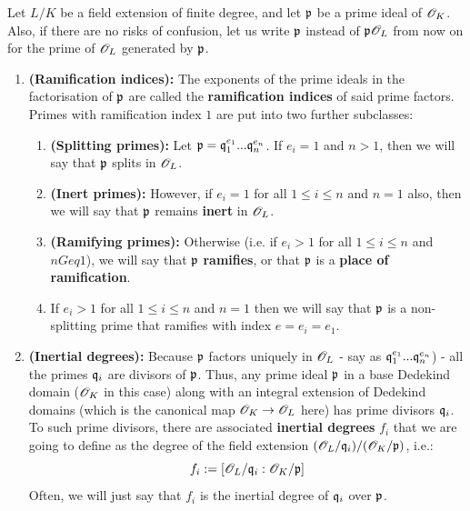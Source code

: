             \begin{definition} \label{def: ramification_indices}
                Let $L/K$ be a field extension of finite degree, and let $\mathfrak{p}$ be a prime ideal of $\mathscr{O}_K$. Also, if there are no risks of confusion, let us write $\mathfrak{p}$ instead of $\mathfrak{p}\mathscr{O}_L$ from now on for the prime of $\mathscr{O}_L$ generated by $\mathfrak{p}$.
                    \begin{enumerate}
                        \item \textbf{(Ramification indices):} The exponents of the prime ideals in the factorisation of $\mathfrak{p}$ are called the \textbf{ramification indices} of said prime factors. Primes with ramification index $1$ are put into two further subclasses:
                            \begin{enumerate}
                                \item \textbf{(Splitting primes):} Let $\mathfrak{p} = \mathfrak{q}_1^{e_1}...\mathfrak{q}_n^{e_n}$. If $e_i = 1$ and $n > 1$, then we will say that $\mathfrak{p}$ splits in $\mathscr{O}_L$.
                                \item \textbf{(Inert primes):} However, if $e_i = 1$ for all $1 \leq i \leq n$ and $n = 1$ also, then we will say that $\mathfrak{p}$ remains \textbf{inert} in $\mathscr{O}_L$.
                                \item \textbf{(Ramifying primes):} Otherwise (i.e. if $e_i > 1$ for all $1 \leq i \leq n$ and $n Geq 1$), we will say that $\mathfrak{p}$ \textbf{ramifies}, or that $\mathfrak{p}$ is a \textbf{place of ramification}.
                                \item If $e_i > 1$ for all $1 \leq i \leq n$ and $n = 1$ then we will say that $\mathfrak{p}$ is a non-splitting prime that ramifies with index $e = e_i = e_1$.
                            \end{enumerate}
                        \item \textbf{(Inertial degrees):} Because $\mathfrak{p}$ factors uniquely in $\mathscr{O}_L$ - say as $\mathfrak{q}_1^{e_1}...\mathfrak{q}_n^{e_n}$) - all the primes $\mathfrak{q}_i$ are divisors of $\mathfrak{p}$. Thus, any prime ideal $\mathfrak{p}$ in a base Dedekind domain ($\mathscr{O}_K$ in this case) along with an integral extension of Dedekind domains (which is the canonical map $\mathscr{O}_K \to \mathscr{O}_L$ here) has prime divisors $\mathfrak{q}_i$. To such prime divisors, there are associated \textbf{inertial degrees} $f_i$ that we are going to define as the degree of the field extension $(\mathscr{O}_L/\mathfrak{q}_i)/(\mathscr{O}_K/\mathfrak{p})$, i.e.:
                            $$f_i := [\mathscr{O}_L/\mathfrak{q}_i : \mathscr{O}_K/\mathfrak{p}]$$
                        Often, we will just say that $f_i$ is the inertial degree of $\mathfrak{q}_i$ over $\mathfrak{p}$.
                    \end{enumerate}
            \end{definition}
            
